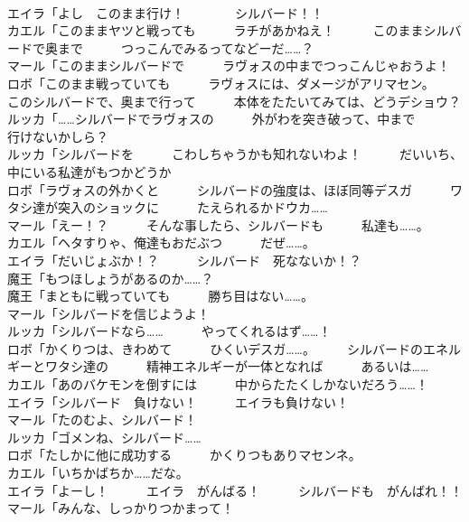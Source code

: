 \documentclass[8pt]{extreport}
\begin{document}
\begin{CJK}{UTF8}{min}
\\	エイラ「よし　このまま行け！　　　　シルバード！！	
\\	カエル「このままヤツと戦っても　　　ラチがあかねえ！　　　このままシルバードで奥まで　　　つっこんでみるってなどーだ……？	
\\	マール「このままシルバードで　　　ラヴォスの中までつっこんじゃおうよ！	
\\	ロボ「このまま戦っていても　　　ラヴォスには、ダメージがアリマセン。	
\\	このシルバードで、奥まで行って　　　本体をたたいてみては、どうデショウ？	
\\	ルッカ「……シルバードでラヴォスの　　　外がわを突き破って、中まで　　　行けないかしら？	
\\	ルッカ「シルバードを　　　こわしちゃうかも知れないわよ！　　　だいいち、中にいる私達がもつかどうか　　　
\\	ロボ「ラヴォスの外かくと　　　シルバードの強度は、ほぼ同等デスガ　　　ワタシ達が突入のショックに　　　たえられるかドウカ……	
\\	マール「えー！？　　　そんな事したら、シルバードも　　　私達も……。	
\\	カエル「ヘタすりゃ、俺達もおだぶつ　　　だぜ……。	
\\	エイラ「だいじょぶか！？　　　シルバード　死なないか！？	
\\	魔王「もつほしょうがあるのか……？	
\\	魔王「まともに戦っていても　　　勝ち目はない……。	
\\	マール「シルバードを信じようよ！	
\\	ルッカ「シルバードなら……　　　やってくれるはず……！	
\\	ロボ「かくりつは、きわめて　　　ひくいデスガ……。　　　シルバードのエネルギーとワタシ達の　　　精神エネルギーが一体となれば　　　あるいは……	
\\	カエル「あのバケモンを倒すには　　　中からたたくしかないだろう……！	
\\	エイラ「シルバード　負けない！　　　エイラも負けない！	
\\	マール「たのむよ、シルバード！	
\\	ルッカ「ゴメンね、シルバード……	
\\	ロボ「たしかに他に成功する　　　かくりつもありマセンネ。	
\\	カエル「いちかばちか……だな。	
\\	エイラ「よーし！　　　エイラ　がんばる！　　　シルバードも　がんばれ！！	
\\	マール「みんな、しっかりつかまって！	

\end{CJK}
\end{document}

